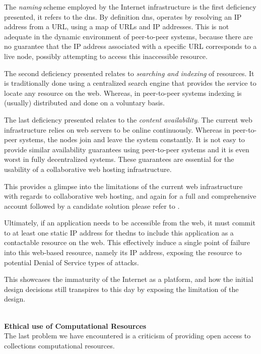 \documentclass[12pt, titlepage]{uo_temp}
\begin{document}
     The \emph{naming} scheme employed by the Internet infrastructure is the first
     deficiency presented, it refers to the \gls{dns}. By definition \gls{dns}, operates
     by resolving an IP address from a URL, using a map of URLs and IP addresses. This is
     not adequate in the dynamic environment of peer-to-peer systems, because there are no
     guarantee that the IP address associated with a specific URL corresponds to a live
     node, possibly attempting to access this inaccessible resource.

     The second deficiency presented relates to \emph{searching and indexing} of
     resources. It is traditionally done using a centralized search engine that provides
     the service to locate any resource on the web. Whereas, in peer-to-peer systems
     indexing is (usually) distributed and done on a voluntary basis.

     The last deficiency presented relates to the \emph{content availability}. The current
     web infrastructure relies on web servers to be online continuously.  Whereas in
     peer-to-peer systems, the nodes join and leave the system constantly. It is not easy
     to provide similar availability guarantees using peer-to-peer systems and it is even
     worst in fully decentralized systems. These guarantees are essential for the
     usability of a collaborative web hosting infrastructure.

     This provides a glimpse into the limitations of the current web infrastructure with
     regards to collaborative web hosting, and again for a full and comprehensive account
     followed by a candidate solution please refer to \cite{ahmed2014collaborative}.

     Ultimately, if an application needs to be accessible from the web, it must commit to
     at least one static IP address for the\gls{dns} to include this application as a
     contactable resource on the web. This effectively induce a single point of failure
     into this web-based resource, namely its IP address, exposing the resource to
     potential Denial of Service types of attacks.

     This showcases the immaturity of the Internet as a platform, and how the initial
     design decisions still transpires to this day by exposing the limitation of the
     design.

     \\ \textbf{Ethical use of Computational Resources} \\ The last problem we have
     encountered is a criticism of providing open access to collections computational
     resources.
\end{document}
